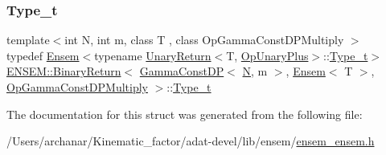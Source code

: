 \subsubsection{\texorpdfstring{Type\_t}{Type\_t}\hspace{0.1cm}{\footnotesize\ttfamily [3/3]}}
{\footnotesize\ttfamily template$<$int N, int m, class T , class Op\+Gamma\+Const\+D\+P\+Multiply $>$ \\
typedef \mbox{\hyperlink{classENSEM_1_1Ensem}{Ensem}}$<$typename \mbox{\hyperlink{structENSEM_1_1UnaryReturn}{Unary\+Return}}$<$T, \mbox{\hyperlink{structENSEM_1_1OpUnaryPlus}{Op\+Unary\+Plus}}$>$\+::\mbox{\hyperlink{structENSEM_1_1BinaryReturn_3_01GammaConstDP_3_01N_00_01m_01_4_00_01Ensem_3_01T_01_4_00_01OpGammaConstDPMultiply_01_4_a839d901ca5cc60b6e639f680b072d368}{Type\+\_\+t}}$>$ \mbox{\hyperlink{structENSEM_1_1BinaryReturn}{E\+N\+S\+E\+M\+::\+Binary\+Return}}$<$ \mbox{\hyperlink{classENSEM_1_1GammaConstDP}{Gamma\+Const\+DP}}$<$ \mbox{\hyperlink{adat__devel_2lib_2hadron_2operator__name__util_8cc_a7722c8ecbb62d99aee7ce68b1752f337}{N}}, m $>$, \mbox{\hyperlink{classENSEM_1_1Ensem}{Ensem}}$<$ T $>$, \mbox{\hyperlink{structENSEM_1_1OpGammaConstDPMultiply}{Op\+Gamma\+Const\+D\+P\+Multiply}} $>$\+::\mbox{\hyperlink{structENSEM_1_1BinaryReturn_3_01GammaConstDP_3_01N_00_01m_01_4_00_01Ensem_3_01T_01_4_00_01OpGammaConstDPMultiply_01_4_a839d901ca5cc60b6e639f680b072d368}{Type\+\_\+t}}}



The documentation for this struct was generated from the following file\+:\begin{DoxyCompactItemize}
\item 
/\+Users/archanar/\+Kinematic\+\_\+factor/adat-\/devel/lib/ensem/\mbox{\hyperlink{adat-devel_2lib_2ensem_2ensem__ensem_8h}{ensem\+\_\+ensem.\+h}}\end{DoxyCompactItemize}
